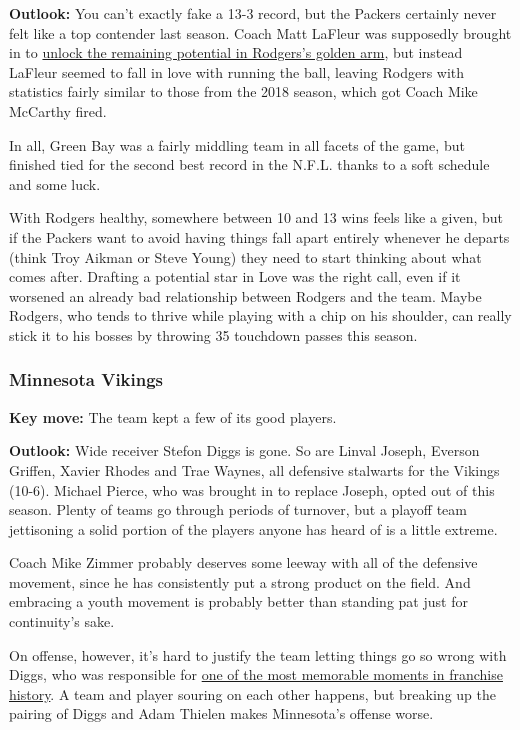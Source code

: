 \textbf{Outlook:} You can't exactly fake a 13-3 record, but the Packers
certainly never felt like a top contender last season. Coach Matt
LaFleur was supposedly brought in to
\href{https://www.nytimes3xbfgragh.onion/2019/11/21/sports/football/aaron-rodgers-packers-coach.html}{unlock
the remaining potential in Rodgers's golden arm}, but instead LaFleur
seemed to fall in love with running the ball, leaving Rodgers with
statistics fairly similar to those from the 2018 season, which got Coach
Mike McCarthy fired.

In all, Green Bay was a fairly middling team in all facets of the game,
but finished tied for the second best record in the N.F.L. thanks to a
soft schedule and some luck.

With Rodgers healthy, somewhere between 10 and 13 wins feels like a
given, but if the Packers want to avoid having things fall apart
entirely whenever he departs (think Troy Aikman or Steve Young) they
need to start thinking about what comes after. Drafting a potential star
in Love was the right call, even if it worsened an already bad
relationship between Rodgers and the team. Maybe Rodgers, who tends to
thrive while playing with a chip on his shoulder, can really stick it to
his bosses by throwing 35 touchdown passes this season.

\hypertarget{minnesota-vikings}{%
\subsubsection{\texorpdfstring{\textbf{Minnesota
Vikings}}{Minnesota Vikings}}\label{minnesota-vikings}}

\textbf{Key move:} The team kept a few of its good players.

\textbf{Outlook:} Wide receiver Stefon Diggs is gone. So are Linval
Joseph, Everson Griffen, Xavier Rhodes and Trae Waynes, all defensive
stalwarts for the Vikings (10-6). Michael Pierce, who was brought in to
replace Joseph, opted out of this season. Plenty of teams go through
periods of turnover, but a playoff team jettisoning a solid portion of
the players anyone has heard of is a little extreme.

Coach Mike Zimmer probably deserves some leeway with all of the
defensive movement, since he has consistently put a strong product on
the field. And embracing a youth movement is probably better than
standing pat just for continuity's sake.

On offense, however, it's hard to justify the team letting things go so
wrong with Diggs, who was responsible for
\href{https://www.nytimes3xbfgragh.onion/2018/01/15/sports/vikings-saints-stefon-diggs-marcus-williams.html}{one
of the most memorable moments in franchise history}. A team and player
souring on each other happens, but breaking up the pairing of Diggs and
Adam Thielen makes Minnesota's offense worse.

